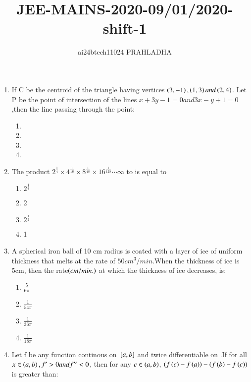\documentclass[journal,12pt,twocolumn]{IEEEtran}
\theoremstyle{remark}
\begin{document}

\vspace{3cm}
\title{JEE-MAINS-2020-09/01/2020-shift-1}
\author{ai24btech11024 PRAHLADHA%
}
\maketitle
\newpage
\bigskip
\renewcommand{\thefigure}{\theenumi}
\renewcommand{\thetable}{\theenumi}
\begin{enumerate}
    \item If C be the centroid of the triangle having vertices $\left(3,-1\right),\left(1,3\right) and \left(2,4\right)$. Let P be the point of intersection of the lines $x+3y-1=0 and 3x-y+1=0$,then the line passing through the point$\colon$
    \begin{enumerate}
        \item {}
        \item {}
        \item {}
        \item {}
    \end{enumerate}
    \item The product $2^{\frac{1}{4}}\times4^{\frac{1}{16}}\times8^{\frac{1}{48}}\times16^{\frac{1}{128}}\cdots\infty$ to is equal to
    \begin{enumerate}
        \item $2^{\frac{1}{4}}$
        \item 2
        \item $2^{\frac{1}{2}}$
        \item 1
    \end{enumerate}
    \item A spherical iron ball of 10 cm radius is coated with a layer of ice of uniform thickness that melts at the rate of $50 cm^{3}/min$.When the thickness of ice is 5cm, then the rate$\left(cm/min.\right)$ at which the thickness of ice decreases, is$\colon$
    \begin{enumerate}
        \item $\frac{5}{6\pi}$
        \item $\frac{1}{54\pi}$
        \item $\frac{1}{36\pi}$
        \item $\frac{1}{18\pi}$
    \end{enumerate}
    \item Let f be any function continous on ${}\left[a,b\right]$ and twice differentiable on .If for all $x\in\left(a,b\right),f^{\prime}>0 and f^{\prime\prime}<0$, then for any $c\in\left(a,b\right)$, $\left(f\left(c\right)-f\left(a\right)\right)-\left(f\left(b\right)-f\left(c\right)\right)$ is greater than$\colon$

\end{enumerate}
\end{document}
